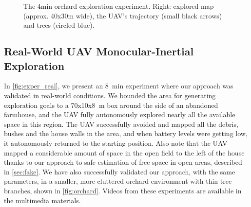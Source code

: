 \documentclass[letterpaper, 10 pt, journal, twoside]{IEEEtran}
\begin{document}
{\begin{figure}[!htb]
  
  \caption{
    {The 4min orchard exploration experiment. Right: explored map (approx. 40x30m wide), the UAV's trajectory (small black arrows) and trees (circled blue).}
  }
  \label{fig:orchard}
\end{figure}


\subsection{Real-World UAV Monocular-Inertial Exploration}
\label{sec:real_exper}
In \autoref{fig:exper_real}, we present an \SI{8}{\minute} experiment where our approach was validated in real-world conditions.
We bounded the area for generating exploration goals to a 70x10x8 $\SI{}{\meter}$ box around the side of an abandoned farmhouse, and the UAV fully autonomously explored nearly all the available space in this region.
The UAV successfully avoided and mapped all the debris, bushes and the house walls in the area, and when battery levels were getting low, it autonomously returned to the starting position.
Also note that the UAV mapped a considerable amount of space in the open field to the left of the house thanks to our approach to safe estimation of free space in open areas, described in \autoref{sec:fake}.
{We have also successfully validated our approach, with the same parameters, in a smaller, more cluttered orchard environment with thin tree branches, shown in \autoref{fig:orchard}.}
Videos from these experiments are available in the multimedia materials. 

\begin{figure}[htb]
\def\subfigwidth{0.49\linewidth}
\centering


\end{figure}}
\end{document}
